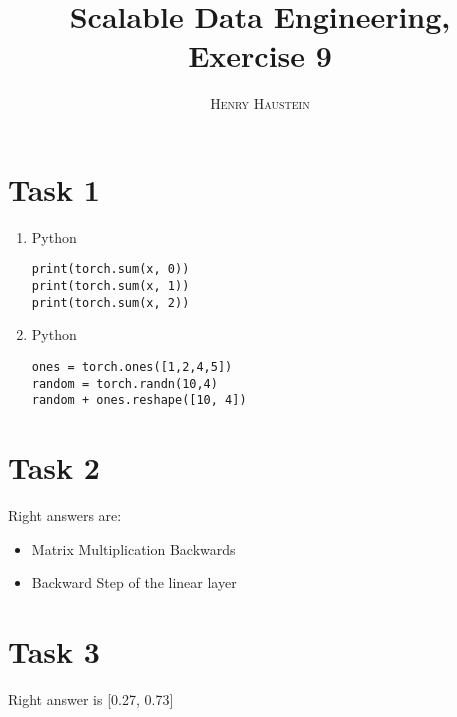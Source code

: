 \documentclass{article}
\title{\textbf{Scalable Data Engineering, Exercise 9}}
\author{\textsc{Henry Haustein}}
\date{}
\begin{document}
	\maketitle
	
	\section*{Task 1}
	\begin{enumerate}[label=(\alph*)]
		\item Python
		\begin{lstlisting}[style=Python]
print(torch.sum(x, 0))
print(torch.sum(x, 1))
print(torch.sum(x, 2))
		\end{lstlisting}
		\item Python
		\begin{lstlisting}[style=Python]
ones = torch.ones([1,2,4,5])
random = torch.randn(10,4)
random + ones.reshape([10, 4])
		\end{lstlisting}
	\end{enumerate}

	\section*{Task 2}
	Right answers are:
	\begin{itemize}
		\item Matrix Multiplication Backwards
		\item Backward Step of the linear layer
	\end{itemize}

	\section*{Task 3}
	Right answer is [0.27, 0.73]
	
\end{document}
